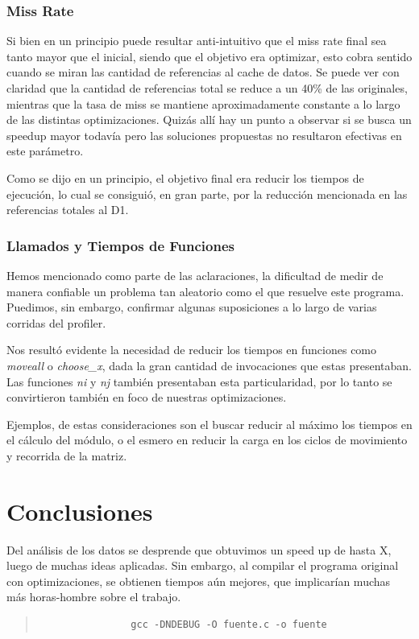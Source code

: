 \documentclass[a4paper,10pt]{article}
\begin{document}
\subsubsection{Miss Rate}

	Si bien en un principio puede resultar anti-intuitivo que el miss rate final sea tanto mayor que el inicial, siendo que el objetivo era optimizar, esto cobra sentido cuando se miran las cantidad de referencias al cache de datos. Se puede ver con claridad que la cantidad de referencias total se reduce a un 40\% de las originales, mientras que la tasa de miss se mantiene aproximadamente constante a lo largo de las distintas optimizaciones. Quiz\'as all\'i hay un punto a observar si se busca un speedup mayor todav\'ia pero las soluciones propuestas no resultaron efectivas en este par\'ametro.
	
	Como se dijo en un principio, el objetivo final era reducir los tiempos de ejecuci\'on, lo cual se consigui\'o, en gran parte, por la reducci\'on mencionada en las referencias totales al D1.
	
\subsubsection{Llamados y Tiempos de Funciones}

	Hemos mencionado como parte de las aclaraciones, la dificultad de medir de manera confiable un problema tan aleatorio como el que resuelve este programa. Puedimos, sin embargo, confirmar algunas suposiciones a lo largo de varias corridas del profiler. 
	
	Nos result\'o evidente la necesidad de reducir los tiempos en funciones como \textit{moveall} o \textit{choose\_x}, dada la gran cantidad de invocaciones que estas presentaban. Las funciones \textit{ni} y \textit{nj} tambi\'en presentaban esta particularidad, por lo tanto se convirtieron tambi\'en en foco de nuestras optimizaciones.
	
	Ejemplos, de estas consideraciones son el buscar reducir al m\'aximo los tiempos en el c\'alculo del m\'odulo, o el esmero en reducir la carga en los ciclos de movimiento y recorrida de la matriz.
	
\section{Conclusiones}

    Del an\'alisis de los datos se desprende que obtuvimos un speed up de hasta X, luego de muchas ideas aplicadas. Sin embargo, al compilar el programa original con optimizaciones, se obtienen tiempos aún mejores, que implicar\'ian muchas más horas-hombre sobre el trabajo.
		\begin{quote}
			\begin{verbatim}
				gcc -DNDEBUG -O fuente.c -o fuente
			\end{verbatim}
		\end{quote}
\end{document}
